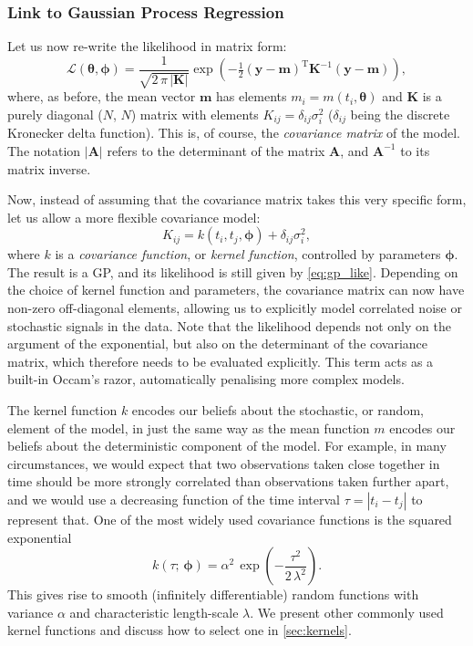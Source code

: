 \documentclass[letterpaper]{ar-1col}
\newcommand{\hyperparams}{\ensuremath{\boldsymbol{\phi}}}
\newcommand{\meanparams}{\ensuremath{\boldsymbol{\theta}}}
\newcommand{\dt}{\ensuremath{\tau}}
\newcommand{\amplitude}{\ensuremath{\alpha}}
\newcommand{\lengthscale}{\ensuremath{\lambda}}
\begin{document}
\subsubsection{Link to Gaussian Process Regression}\label{sec:gp-lsq-link}
Let us now re-write the likelihood in matrix form:
\begin{equation}
\label{eq:gp_like}
  \mathcal{L}(\meanparams,\hyperparams) = 
  \frac{1}{\sqrt{2\,\pi\,|\mathbf{K}|}} \exp \left(-\tfrac{1}{2}(\mathbf{y}-\mathbf{m})^{\mathrm{T}} \mathbf{K}^{-1}
  (\mathbf{y}-\mathbf{m}) \right),
\end{equation}
where, as before, the mean vector $\mathbf{m}$ has elements $m_i=m(t_i,\meanparams)$ and $\mathbf{K}$ is a purely diagonal ($N$, $N$) matrix with elements $K_{ij} = \delta_{ij} \sigma_i^2$ ($\delta_{ij}$ being the discrete Kronecker delta function). This is, of course, the \emph{covariance matrix} of the model. The notation $|\mathbf{A}|$ refers to the determinant of the matrix $\mathbf{A}$, and $\mathbf{A}^{-1}$ to its matrix inverse.

Now, instead of assuming that the covariance matrix takes this very specific form, let us allow a more flexible covariance model:
\begin{equation}
  K_{ij} = k(t_i,t_j,\hyperparams) + \delta_{ij} \sigma_i^2,
\end{equation}
where $k$ is a \emph{covariance function}, or \emph{kernel function}, controlled by parameters $\hyperparams$. The result is a GP, and its likelihood is still given by \autoref{eq:gp_like}. Depending on the choice of kernel function and parameters, the covariance matrix can now have non-zero off-diagonal elements, allowing us to explicitly model correlated noise or stochastic signals in the data.
Note that the likelihood depends not only on the argument of the exponential, but also on the determinant of the covariance matrix, which therefore needs to be evaluated explicitly. This term acts as a built-in Occam's razor, automatically penalising more complex models.

The kernel function $k$ encodes our beliefs about the stochastic, or random, element of the model, in just the same way as the mean function $m$ encodes our beliefs about the deterministic component of the model. For example, in many circumstances, we would expect that two observations taken close together in time should be more strongly correlated than observations taken further apart, and we would use a decreasing function of the time interval $\dt=|t_i-t_j|$ to represent that. One of the most widely used covariance functions is the squared exponential
\begin{equation}
\label{eq:kse}
  k(\dt;\,\hyperparams) = \amplitude^2\,\exp\left(-\frac{\dt^2}{2\,\lengthscale^2}\right).
\end{equation}
This gives rise to smooth (infinitely differentiable) random functions with variance $\amplitude$ and characteristic length-scale $\lambda$. We present other commonly used kernel functions and discuss how to select one in \autoref{sec:kernels}.
\end{document}
